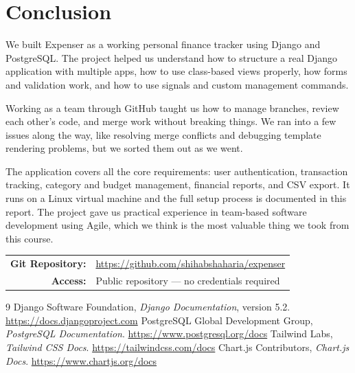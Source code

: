 \documentclass[12pt,a4paper]{report}
\begin{document}
\chapter{Conclusion}

We built Expenser as a working personal finance tracker using Django and PostgreSQL. The project helped us understand how to structure a real Django application with multiple apps, how to use class-based views properly, how forms and validation work, and how to use signals and custom management commands.

Working as a team through GitHub taught us how to manage branches, review each other's code, and merge work without breaking things. We ran into a few issues along the way, like resolving merge conflicts and debugging template rendering problems, but we sorted them out as we went.

The application covers all the core requirements: user authentication, transaction tracking, category and budget management, financial reports, and CSV export. It runs on a Linux virtual machine and the full setup process is documented in this report. The project gave us practical experience in team-based software development using Agile, which we think is the most valuable thing we took from this course.

\vspace{0.8cm}

\begin{center}
\begin{tabular}{@{}rl@{}}
\textbf{Git Repository:} & \url{https://github.com/shihabshaharia/expenser} \\[4pt]
\textbf{Access:}         & Public repository --- no credentials required \\
\end{tabular}
\end{center}

\begin{thebibliography}{9}
 Django Software Foundation, \textit{Django Documentation}, version 5.2. \url{https://docs.djangoproject.com}
 PostgreSQL Global Development Group, \textit{PostgreSQL Documentation}. \url{https://www.postgresql.org/docs}
 Tailwind Labs, \textit{Tailwind CSS Docs}. \url{https://tailwindcss.com/docs}
 Chart.js Contributors, \textit{Chart.js Docs}. \url{https://www.chartjs.org/docs}
\end{thebibliography}
\end{document}
